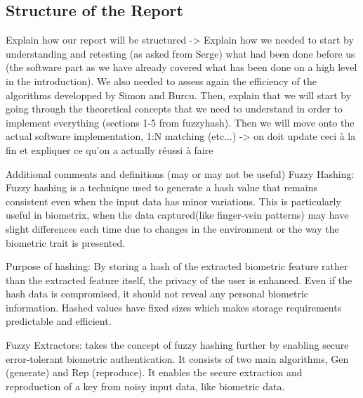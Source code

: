\subsection{Structure of the Report}
Explain how our report will be structured -> Explain how we needed to start by understanding and retesting (as asked from Serge) what had been done before us (the software part as we have already covered what has been done on a high level in the introduction). We also needed to assess again the efficiency of the algorithms developped by Simon and Burcu. Then, explain that we will start by going through the theoretical concepts that we need to understand in order to implement everything (sections 1-5 from fuzzyhash). Then we will move onto the actual software implementation, 1:N matching (etc...) -> on doit update ceci à la fin et expliquer ce qu'on a actually réussi à faire


Additional comments and definitions (may or may not be useful)
Fuzzy Hashing: Fuzzy hashing is a technique used to generate a hash value that remains consistent even when the input data has minor variations. This is particularly useful in biometrix, when the data captured(like finger-vein patterns) may have slight differences each time due to changes in the environment or the way the biometric trait is presented.

Purpose of hashing: By storing a hash of the extracted biometric feature rather than the extracted feature itself, the privacy of the user is enhanced. Even if the hash data is compromised, it should not reveal any personal biometric information. Hashed values have fixed sizes which makes storage requirements predictable and efficient. 

Fuzzy Extractors: takes the concept of fuzzy hashing further by enabling secure error-tolerant biometric authentication. It consists of two main algorithms, Gen (generate) and Rep (reproduce). It enables the secure extraction and reproduction of a key from noisy input data, like biometric data. 